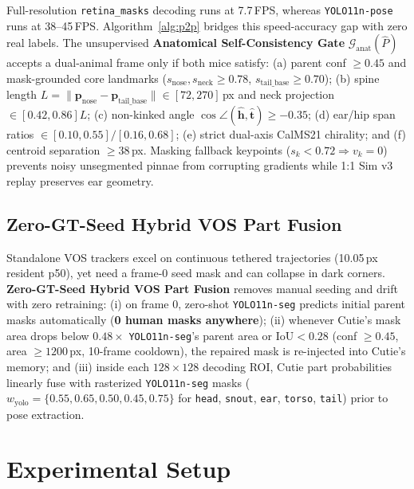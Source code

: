 \documentclass[10pt,twocolumn,letterpaper]{article}
\begin{document}
Full-resolution \texttt{retina\_masks} decoding runs at 7.7\,FPS, whereas \texttt{YOLO11n-pose} runs at 38--45\,FPS. Algorithm~\ref{alg:p2p} bridges this speed-accuracy gap with zero real labels. The unsupervised \textbf{Anatomical Self-Consistency Gate} $\mathcal{G}_{\text{anat}}(\hat{P})$ accepts a dual-animal frame only if both mice satisfy: (a) parent conf $\ge 0.45$ and mask-grounded core landmarks ($s_{\text{nose}}, s_{\text{neck}} \ge 0.78$, $s_{\text{tail\_base}} \ge 0.70$); (b) spine length $L=\|\mathbf{p}_{\text{nose}}-\mathbf{p}_{\text{tail\_base}}\|\in[72, 270]$\,px and neck projection $\in[0.42, 0.86]L$; (c) non-kinked angle $\cos\angle(\hat{\mathbf{h}},\hat{\mathbf{t}})\ge -0.35$; (d) ear/hip span ratios $\in[0.10,0.55]/[0.16,0.68]$; (e) strict dual-axis CalMS21 chirality; and (f) centroid separation $\ge 38$\,px. Masking fallback keypoints ($s_k < 0.72 \Rightarrow v_k=0$) prevents noisy unsegmented pinnae from corrupting gradients while 1:1 Sim v3 replay preserves ear geometry.

\subsection{Zero-GT-Seed Hybrid VOS Part Fusion}
\label{sec:hybrid}

Standalone VOS trackers excel on continuous tethered trajectories (10.05\,px resident p50), yet need a frame-0 seed mask and can collapse in dark corners. \textbf{Zero-GT-Seed Hybrid VOS Part Fusion} removes manual seeding and drift with zero retraining: (i) on frame 0, zero-shot \texttt{YOLO11n-seg} predicts initial parent masks automatically (\textbf{0 human masks anywhere}); (ii) whenever Cutie's mask area drops below $0.48\times$ \texttt{YOLO11n-seg}'s parent area or $\mathrm{IoU} < 0.28$ (conf $\ge 0.45$, area $\ge 1200$\,px, 10-frame cooldown), the repaired mask is re-injected into Cutie's memory; and (iii) inside each $128\times 128$ decoding ROI, Cutie part probabilities linearly fuse with rasterized \texttt{YOLO11n-seg} masks ($w_{\text{yolo}}=\{0.55, 0.65, 0.50, 0.45, 0.75\}$ for \texttt{head}, \texttt{snout}, \texttt{ear}, \texttt{torso}, \texttt{tail}) prior to pose extraction.

\section{Experimental Setup}
\end{document}
